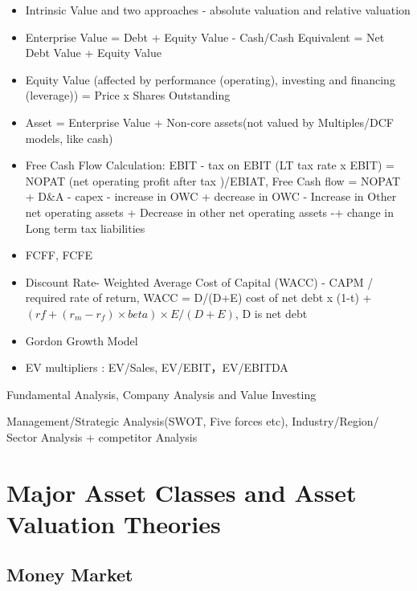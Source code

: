 \documentclass[11pt, openany]{book}              %
\begin{document}
\begin{itemize}
	\item Intrinsic Value and two approaches - absolute valuation and relative valuation 
	\item Enterprise Value = Debt + Equity Value - Cash/Cash Equivalent = Net Debt Value + Equity Value
	\item Equity Value (affected by performance (operating), investing and financing (leverage)) = Price x Shares Outstanding
	\item Asset = Enterprise Value + Non-core assets(not valued by Multiples/DCF models, like cash)
	\item Free Cash Flow Calculation: EBIT - tax on EBIT (LT tax rate x EBIT) = NOPAT (net operating profit after tax )/EBIAT, Free Cash flow = NOPAT + D\&A - capex - increase in OWC + decrease in OWC - Increase in Other net operating assets + Decrease in other net operating assets -+ change in Long term tax liabilities
	\item FCFF, FCFE 
	\item Discount Rate- Weighted Average Cost of Capital (WACC) - CAPM / required rate of return, WACC = D/(D+E) cost of net debt x (1-t) + $(rf+(r_m-r_f)\times beta)\times E/(D+E)$, D is net debt
	\item Gordon Growth Model
	\item EV multipliers : EV/Sales, EV/EBIT，EV/EBITDA
\end{itemize}


Fundamental Analysis, Company Analysis and Value Investing

Management/Strategic Analysis(SWOT, Five forces etc), Industry/Region/ Sector Analysis + competitor Analysis 

\chapter{Major Asset Classes and Asset Valuation Theories}
\section{Money Market}
\end{document}
